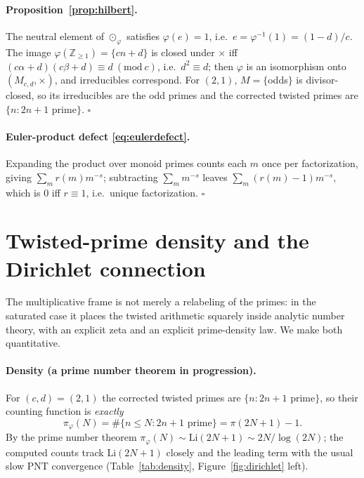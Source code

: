 \documentclass[11pt,a4paper]{article}
\newcommand{\Z}{\mathbb{Z}}
\theoremstyle{plain}
\theoremstyle{definition}
\theoremstyle{remark}
\begin{document}
\paragraph{Proposition~\ref{prop:hilbert}.} The neutral element of
$\odot_\varphi$ satisfies $\varphi(e)=1$, i.e.\ $e=\varphi^{-1}(1)=(1-d)/c$. The
image $\varphi(\Z_{\ge1})=\{cn+d\}$ is closed under $\times$ iff
$(c\alpha+d)(c\beta+d)\equiv d\ (\mathrm{mod}\ c)$, i.e.\ $d^2\equiv d$; then
$\varphi$ is an isomorphism onto $(M_{c,d},\times)$, and irreducibles correspond.
For $(2,1)$, $M=\{$odds$\}$ is divisor-closed, so its irreducibles are the odd
primes and the corrected twisted primes are $\{n:2n+1\text{ prime}\}$. $\square$

\paragraph{Euler-product defect \eqref{eq:eulerdefect}.} Expanding the product
over monoid primes counts each $m$ once per factorization, giving
$\sum_m r(m)m^{-s}$; subtracting $\sum_m m^{-s}$ leaves
$\sum_m(r(m)-1)m^{-s}$, which is $0$ iff $r\equiv1$, i.e.\ unique factorization.
$\square$

\section{Twisted-prime density and the Dirichlet connection}
\label{app:dirichlet}

The multiplicative frame is not merely a relabeling of the primes: in the
saturated case it places the twisted arithmetic squarely inside analytic number
theory, with an explicit zeta and an explicit prime-density law. We make both
quantitative.

\paragraph{Density (a prime number theorem in progression).} For $(c,d)=(2,1)$
the corrected twisted primes are $\{n:2n+1\text{ prime}\}$, so their counting
function is \emph{exactly}
\begin{equation}\label{eq:density}
\pi_\varphi(N)=\#\{n\le N:2n+1\text{ prime}\}=\pi(2N+1)-1.
\end{equation}
By the prime number theorem $\pi_\varphi(N)\sim\mathrm{Li}(2N+1)\sim 2N/\log(2N)$;
the computed counts track $\mathrm{Li}(2N+1)$ closely and the leading term with
the usual slow PNT convergence (Table~\ref{tab:density},
Figure~\ref{fig:dirichlet} left).
\end{document}
